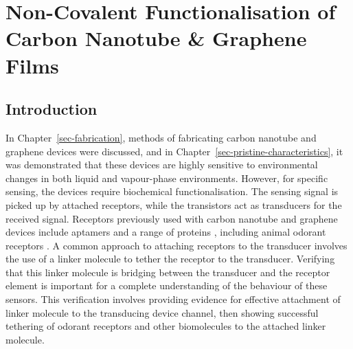 \documentclass[
  a4paper,
]{scrbook}
\begin{document}

\hypertarget{sec-noncovalent-functionalisation}{%
\chapter{Non-Covalent Functionalisation of Carbon Nanotube \& Graphene
Films}\label{sec-noncovalent-functionalisation}}

\hypertarget{introduction-4}{%
\section{Introduction}\label{introduction-4}}

In Chapter~\ref{sec-fabrication}, methods of fabricating carbon nanotube
and graphene devices were discussed, and in
Chapter~\ref{sec-pristine-characteristics}, it was demonstrated that
these devices are highly sensitive to environmental changes in both
liquid and vapour-phase environments. However, for specific sensing, the
devices require biochemical functionalisation. The sensing signal is
picked up by attached receptors, while the transistors act as
transducers for the received signal. Receptors previously used with
carbon nanotube and graphene devices include aptamers
\autocite{Khan2021,Nguyen2021,Shkodra2021,Nekrasov2021,Mishyn2022,Cassie2023}
and a range of proteins \autocite{Lerner2014,Ahn2020,Tong2020,Wang2020},
including animal odorant receptors
\autocite{Goldsmith2011,Lee2018,Murugathas2019a,Murugathas2020,Moon2020,Yoo2022}.
A common approach to attaching receptors to the transducer involves the
use of a linker molecule to tether the receptor to the transducer.
Verifying that this linker molecule is bridging between the transducer
and the receptor element is important for a complete understanding of
the behaviour of these sensors. This verification involves providing
evidence for effective attachment of linker molecule to the transducing
device channel, then showing successful tethering of odorant receptors
and other biomolecules to the attached linker molecule.
\end{document}

